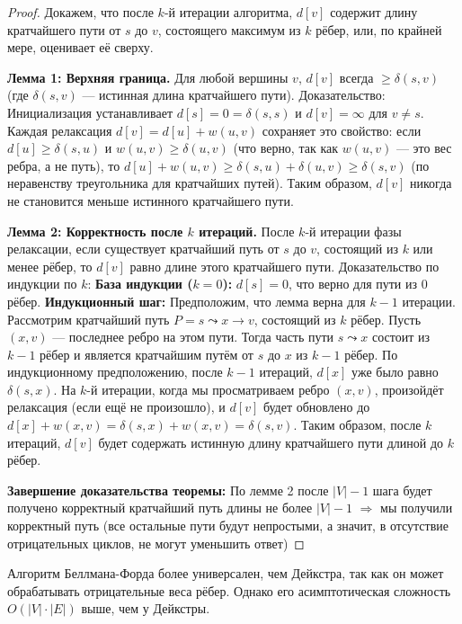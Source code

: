 \begin{proof}
	Докажем, что после $k$-й итерации алгоритма, $d[v]$ содержит длину кратчайшего пути от $s$ до $v$, состоящего максимум из $k$ рёбер, или, по крайней мере, оценивает её сверху.
	
	\textbf{Лемма 1: Верхняя граница.}
	Для любой вершины $v$, $d[v]$ всегда $\ge \delta(s,v)$ (где $\delta(s,v)$ --- истинная длина кратчайшего пути).
	Доказательство: Инициализация устанавливает $d[s]=0=\delta(s,s)$ и $d[v]=\infty$ для $v \ne s$. Каждая релаксация $d[v] = d[u] + w(u,v)$ сохраняет это свойство: если $d[u] \ge \delta(s,u)$ и $w(u,v) \ge \delta(u,v)$ (что верно, так как $w(u,v)$ --- это вес ребра, а не путь), то $d[u] + w(u,v) \ge \delta(s,u) + \delta(u,v) \ge \delta(s,v)$ (по неравенству треугольника для кратчайших путей). Таким образом, $d[v]$ никогда не становится меньше истинного кратчайшего пути.
	
	\textbf{Лемма 2: Корректность после $k$ итераций.}
	После $k$-й итерации фазы релаксации, если существует кратчайший путь от $s$ до $v$, состоящий из $k$ или менее рёбер, то $d[v]$ равно длине этого кратчайшего пути.
	Доказательство по индукции по $k$:
	\textbf{База индукции ($k=0$):} $d[s]=0$, что верно для пути из 0 рёбер.
	\textbf{Индукционный шаг:} Предположим, что лемма верна для $k-1$ итерации.
	Рассмотрим кратчайший путь $P = s \leadsto x \to v$, состоящий из $k$ рёбер. Пусть $(x,v)$ --- последнее ребро на этом пути. Тогда часть пути $s \leadsto x$ состоит из $k-1$ рёбер и является кратчайшим путём от $s$ до $x$ из $k-1$ рёбер.
	По индукционному предположению, после $k-1$ итераций, $d[x]$ уже было равно $\delta(s,x)$.
	На $k$-й итерации, когда мы просматриваем ребро $(x,v)$, произойдёт релаксация (если ещё не произошло), и $d[v]$ будет обновлено до $d[x] + w(x,v) = \delta(s,x) + w(x,v) = \delta(s,v)$.
	Таким образом, после $k$ итераций, $d[v]$ будет содержать истинную длину кратчайшего пути длиной до $k$ рёбер.
	
	\textbf{Завершение доказательства теоремы:}
	По лемме 2 после $|V| - 1$ шага будет получено корректный кратчайший путь длины не более $|V| - 1$ $\Rightarrow$ мы получили корректный путь (все остальные пути будут непростыми, а значит, в отсутствие отрицательных циклов, не могут уменьшить ответ)
\end{proof}

\begin{remark}
	Алгоритм Беллмана-Форда более универсален, чем Дейкстра, так как он может обрабатывать отрицательные веса рёбер. Однако его асимптотическая сложность $O(|V| \cdot |E|)$ выше, чем у Дейкстры.
\end{remark}

